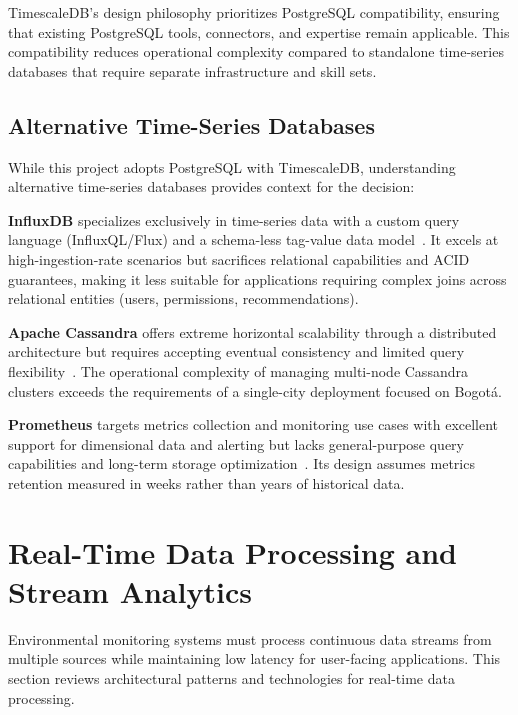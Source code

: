 TimescaleDB's design philosophy prioritizes PostgreSQL compatibility, ensuring that existing PostgreSQL tools, connectors, and expertise remain applicable. This compatibility reduces operational complexity compared to standalone time-series databases that require separate infrastructure and skill sets.

\subsection{Alternative Time-Series Databases}
\label{subsec:lit_alternatives}

While this project adopts PostgreSQL with TimescaleDB, understanding alternative time-series databases provides context for the decision:

\textbf{InfluxDB} specializes exclusively in time-series data with a custom query language (InfluxQL/Flux) and a schema-less tag-value data model~\citep{influxdb}. It excels at high-ingestion-rate scenarios but sacrifices relational capabilities and ACID guarantees, making it less suitable for applications requiring complex joins across relational entities (users, permissions, recommendations).

\textbf{Apache Cassandra} offers extreme horizontal scalability through a distributed architecture but requires accepting eventual consistency and limited query flexibility~\citep{cassandra}. The operational complexity of managing multi-node Cassandra clusters exceeds the requirements of a single-city deployment focused on Bogotá.

\textbf{Prometheus} targets metrics collection and monitoring use cases with excellent support for dimensional data and alerting but lacks general-purpose query capabilities and long-term storage optimization~\citep{prometheus}. Its design assumes metrics retention measured in weeks rather than years of historical data.

\section{Real-Time Data Processing and Stream Analytics}
\label{sec:lit_streaming}

Environmental monitoring systems must process continuous data streams from multiple sources while maintaining low latency for user-facing applications. This section reviews architectural patterns and technologies for real-time data processing.

